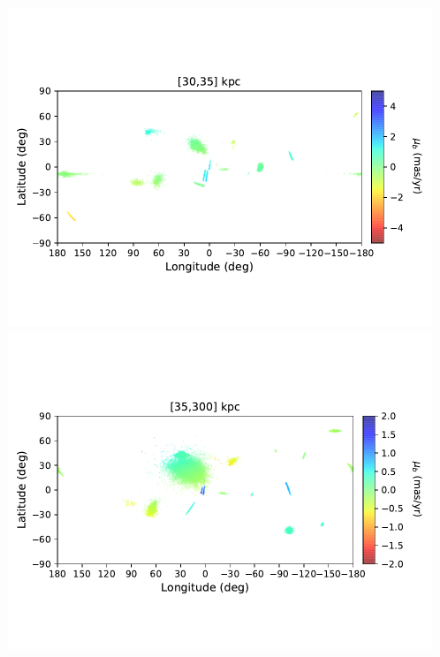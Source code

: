 \begin{figure}[h!]
\begin{center}
            \includegraphics[clip=true, trim = 0mm 20mm 0mm 20mm, width=0.9\columnwidth]{images/PII_ensemble_LB_D30-35_PMB_new.pdf}
            \includegraphics[clip=true, trim = 0mm 20mm 0mm 20mm, width=0.9\columnwidth]{images/PII_ensemble_LB_D35-300_PMB_new.pdf}


\end{center}
\end{figure}
